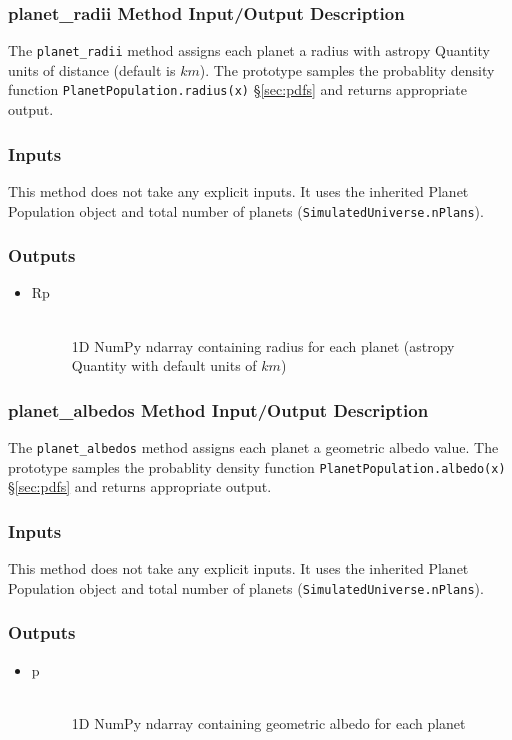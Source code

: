 \documentclass[cleanfoot]{asme2ej}
\begin{document}
\subsubsection{planet\_radii Method Input/Output Description} \label{sec:planetradiitask}
The \verb+planet_radii+ method assigns each planet a radius with astropy Quantity units of distance (default is $ km $). The prototype samples the probablity density function \verb+PlanetPopulation.radius(x)+ \S\ref{sec:pdfs} and returns appropriate output.

\subsubsection*{Inputs}
This method does not take any explicit inputs.  It uses the inherited Planet Population object and total number of planets (\verb+SimulatedUniverse.nPlans+).

\subsubsection*{Outputs}
\begin{itemize}
    \item 
    \begin{description}
        \item[Rp] \hfill \\
        1D NumPy ndarray containing radius for each planet (astropy Quantity with default units of $ km $)
    \end{description}
\end{itemize}

\subsubsection{planet\_albedos Method Input/Output Description} \label{sec:planetalbedostask}
The \verb+planet_albedos+ method assigns each planet a geometric albedo value. The prototype samples the probablity density function \verb+PlanetPopulation.albedo(x)+ \S\ref{sec:pdfs} and returns appropriate output.

\subsubsection*{Inputs}
This method does not take any explicit inputs.  It uses the inherited Planet Population object and total number of planets (\verb+SimulatedUniverse.nPlans+).

\subsubsection*{Outputs}
\begin{itemize}
    \item 
    \begin{description}
        \item[p] \hfill \\
        1D NumPy ndarray containing geometric albedo for each planet 
    \end{description}
\end{itemize}
\end{document}
